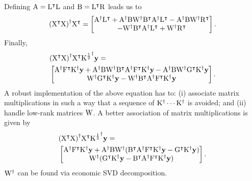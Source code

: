 \documentclass[twocolumn,draft]{article}
\begin{document}
Defining $\rmA = \trans{\rmL}\rmL$ and $\rmB = \trans{\rmL}\rmR$ leads us to
\begin{equation*}
	\pinv{(\trans{\rmX}\rmX)}\trans{\rmX} =
		\begin{bmatrix}
			\pinv{\rmA}\trans{\rmL}
			+ \pinv{\rmA}\rmB\pinv{\rmW}\trans{\rmB}\pinv{\rmA}\trans{\rmL}
			-\pinv{\rmA}\rmB\pinv{\rmW}\trans{\rmR}\\
			-\pinv{\rmW}\trans{\rmB}\pinv{\rmA}\trans{\rmL}
			+ \pinv{\rmW}\trans{\rmR}
		\end{bmatrix}.
\end{equation*}
Finally,
\begin{align*}
	&\pinv{(\trans{\rmX}\rmX)}\trans{\rmX} \pinv{\rmK^{\haf}}\bfy = \\
	&\begin{bmatrix}
		\pinv{\rmA}\trans{\rmF}\pinv{\rmK}\bfy
		+ \pinv{\rmA}\rmB\pinv{\rmW}\trans{\rmB}\pinv{\rmA}\trans{\rmF}\pinv{\rmK}\bfy
		-\pinv{\rmA}\rmB\pinv{\rmW}\trans{\rmG}\pinv{\rmK}\bfy \\
		\pinv{\rmW}\trans{\rmG}\pinv{\rmK}\bfy
		-\pinv{\rmW}\trans{\rmB}\pinv{\rmA}\trans{\rmF}\pinv{\rmK}\bfy
	\end{bmatrix}.
\end{align*}
A robust implementation of the above equation has to:
(i) associate matrix multiplications in such a way that a sequence of
$\pinv{\rmK}\cdots\pinv{\rmK}$ is avoided;
and (ii) handle low-rank matrices $\rmW$.
A better association of matrix multiplications is given by
\begin{align*}
	&\pinv{(\trans{\rmX}\rmX)}\trans{\rmX} \pinv{\rmK^{\haf}}\bfy = \\
	&\begin{bmatrix}
		\pinv{\rmA}\trans{\rmF}\pinv{\rmK}\bfy
		+ \pinv{\rmA}\rmB\pinv{\rmW}(\trans{\rmB}\pinv{\rmA}\trans{\rmF}\pinv{\rmK}
		\bfy-\trans{\rmG}\pinv{\rmK}\bfy) \\
		\pinv{\rmW}(\trans{\rmG}\pinv{\rmK}\bfy
		-\trans{\rmB}\pinv{\rmA}\trans{\rmF}\pinv{\rmK}\bfy)
	\end{bmatrix}.
\end{align*}
$\pinv{\rmW}$ can be found via economic SVD decomposition.

\printbibliography\
\end{document}
